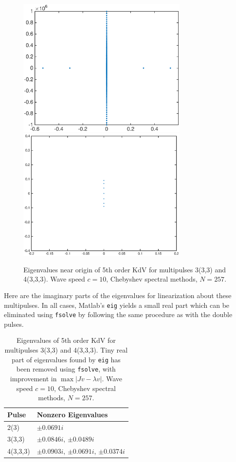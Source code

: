 \documentclass[12pt]{article}
\begin{document}
\begin{figure}[H]
	\includegraphics[width=8.5cm]{cheb10um2_3lambda.eps}
	\includegraphics[width=8.5cm]{cheb10um2_4lambda.eps}
	\caption{Eigenvalues near origin of 5th order KdV for multipulses 3(3,3) and 4(3,3,3). Wave speed $c = 10$, Chebyshev spectral methods, $N = 257$.}
\end{figure}

Here are the imaginary parts of the eigenvalues for linearization about these multipulses. In all cases, Matlab's \texttt{eig} yields a small real part which can be eliminated using \texttt{fsolve} by following the same procedure as with the double pulses.

\begin{table}[H]
\begin{tabular}{l|l}
  Pulse    &  Nonzero Eigenvalues \\ \hline
  2(3)     &     $\pm 0.0691i$ \\ 
  3(3,3)   &     $\pm 0.0846i$, $\pm 0.0489i$   \\ 
  4(3,3,3) &     $\pm 0.0903i$, $\pm 0.0691i$, $\pm 0.0374i$ \\ 
\end{tabular}
\caption{Eigenvalues of 5th order KdV for multipulses 3(3,3) and 4(3,3,3). Tiny real part of eigenvalues found by \texttt{eig} has been removed using \texttt{fsolve}, with improvement in $\max{|Jv - \lambda v|}$. Wave speed $c = 10$, Chebyshev spectral methods, $N = 257$.}
\end{table}

\printbibliography
\end{document}
